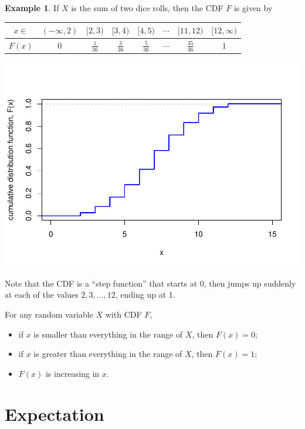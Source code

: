 \documentclass[
  a4paper,
]{book}
\providecommand{\tightlist}{%
  \setlength{\itemsep}{0pt}\setlength{\parskip}{0pt}}
\theoremstyle{definition}
\theoremstyle{definition}
\newtheorem{example}{Example}[chapter]
\theoremstyle{definition}
\theoremstyle{definition}
\theoremstyle{remark}
\begin{document}
\begin{example}
If \(X\) is the sum of two dice rolls, then the CDF \(F\) is given by

\begin{longtable}[]{@{}cccccccc@{}}
\toprule
\(x \in {}\) & \((-\infty, 2)\) & \([2,3)\) & \([3,4)\) & \([4,5)\) & \(\cdots\) & \([11,12)\) & \([12, \infty)\) \\
\midrule
\endhead
\(F(x)\) & \(0\) & \(\frac{1}{36}\) & \(\frac{3}{36}\) & \(\frac{5}{36}\) & \(\cdots\) & \(\frac{35}{36}\) & \(1\) \\
\bottomrule
\end{longtable}

\includegraphics{math1710_files/figure-latex/dice-cdf-1.pdf}

Note that the CDF is a ``step function'' that starts at 0, then jumps up suddenly at each of the values \(2, 3, \dots, 12\), ending up at 1.
\end{example}

For any random variable \(X\) with CDF \(F\),

\begin{itemize}
\tightlist
\item
  if \(x\) is smaller than everything in the range of \(X\), then \(F(x) = 0\);
\item
  if \(x\) is greater than everything in the range of \(X\), then \(F(x) = 1\);
\item
  \(F(x)\) is increasing in \(x\).
\end{itemize}

\hypertarget{expectation}{%
\section{Expectation}\label{expectation}}
\end{document}

